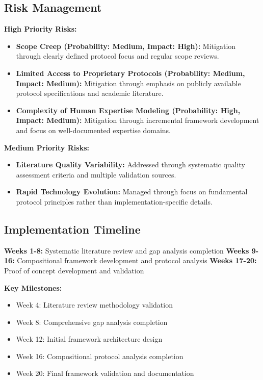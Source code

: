 \documentclass[12pt,a4paper]{article}
\begin{document}
\subsection{Risk Management}

\textbf{High Priority Risks:}
\begin{itemize}
\item \textbf{Scope Creep (Probability: Medium, Impact: High):} Mitigation through clearly defined protocol focus and regular scope reviews.
\item \textbf{Limited Access to Proprietary Protocols (Probability: Medium, Impact: Medium):} Mitigation through emphasis on publicly available protocol specifications and academic literature.
\item \textbf{Complexity of Human Expertise Modeling (Probability: High, Impact: Medium):} Mitigation through incremental framework development and focus on well-documented expertise domains.
\end{itemize}

\textbf{Medium Priority Risks:}
\begin{itemize}
\item \textbf{Literature Quality Variability:} Addressed through systematic quality assessment criteria and multiple validation sources.
\item \textbf{Rapid Technology Evolution:} Managed through focus on fundamental protocol principles rather than implementation-specific details.
\end{itemize}

\subsection{Implementation Timeline}

\textbf{Weeks 1-8:} Systematic literature review and gap analysis completion
\textbf{Weeks 9-16:} Compositional framework development and protocol analysis
\textbf{Weeks 17-20:} Proof of concept development and validation

\textbf{Key Milestones:}
\begin{itemize}
\item Week 4: Literature review methodology validation
\item Week 8: Comprehensive gap analysis completion
\item Week 12: Initial framework architecture design
\item Week 16: Compositional protocol analysis completion
\item Week 20: Final framework validation and documentation
\end{itemize}
\end{document}
